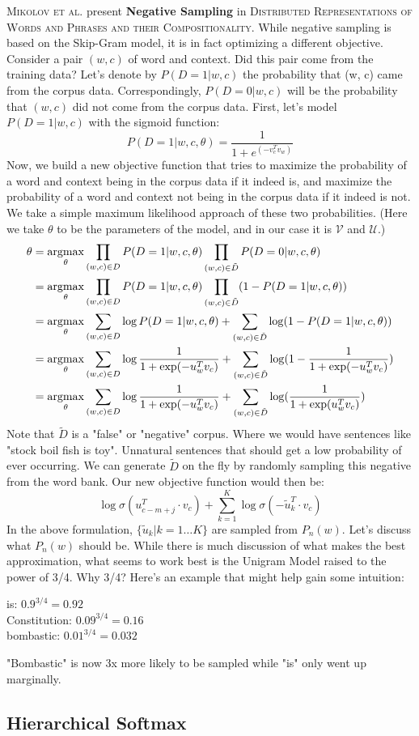 \documentclass{tufte-handout}
\newcommand{\argmax}{\operatornamewithlimits{argmax}}
\begin{document}
\textsc{Mikolov et al.} present \textbf{Negative Sampling} in \textsc{Distributed Representations of Words and Phrases and their Compositionality}. While negative sampling is based on the Skip-Gram model, it is in fact optimizing a different objective. Consider a pair $(w, c)$ of word and context. Did this pair come from the training data? Let's denote by $P(D = 1|w, c)$ the probability that (w, c) came from the corpus data. Correspondingly, $P(D = 0|w, c)$ will be the probability that $(w, c)$ did not come from the corpus data. First, let's model $P(D = 1|w, c)$ with the sigmoid function:
$$ P(D = 1|w, c, \theta) = \frac{1}{1+ e^{(-v_c^Tv_w)}}$$
Now, we build a new objective function that tries to maximize the probability of a word and context being in the corpus data if it indeed is, and maximize the probability of a word and context not being in the corpus data if it indeed is not. We take a simple maximum likelihood approach of these two probabilities. (Here we take $\theta$ to be the parameters of the model, and in our case it is $\mathcal{V}$ and $\mathcal{U}$.)
\begin{align*}
\theta &= \argmax_{\theta} \prod_{(w,c) \in D} P(D = 1|w, c, \theta) \prod_{(w,c) \in \tilde{D}} P(D = 0|w, c, \theta) \\
&= \argmax_{\theta} \prod_{(w,c) \in D} P(D = 1|w, c, \theta) \prod_{(w,c) \in \tilde{D}} (1 - P(D = 1|w, c, \theta))\\
&= \argmax_{\theta} \sum_{(w,c) \in D} \log P(D = 1|w, c, \theta) + \sum_{(w,c) \in \tilde{D}} \log(1 - P(D = 1|w, c, \theta))\\
&= \argmax_{\theta} \sum_{(w,c) \in D} \log \frac{1}{1 + \exp(-u_w^Tv_c)} + \sum_{(w,c) \in \tilde{D}} \log(1 - \frac{1}{1 + \exp(-u_w^Tv_c)} )\\
&= \argmax_{\theta} \sum_{(w,c) \in D} \log \frac{1}{1 + \exp(-u_w^Tv_c)} + \sum_{(w,c) \in \tilde{D}} \log(\frac{1}{1 + \exp(u_w^Tv_c)} )\\
\end{align*}
Note that $\tilde{D}$ is a "false" or "negative" corpus. Where we would have sentences like "stock boil fish is toy". Unnatural sentences that should get a low probability of ever occurring. We can generate $\tilde{D}$ on the fly by randomly sampling this negative from the word bank. Our new objective function would then be:
$$ \log \sigma (u_{c-m+j}^{T}\cdot v_{c})+ \sum_{k = 1}^K \log \sigma (- \tilde{u}_{k}^{T}\cdot v_{c}) $$
In the above formulation, $\{\tilde{u}_{k} | k = 1\hdots K\}$ are sampled from $P_n(w)$. Let's discuss what $P_n(w)$ should be. While there is much discussion of what makes the best approximation, what seems to work best is the Unigram Model raised to the power of 3/4. Why 3/4? Here's an example that might help gain some intuition:\\
\begin{center}
is: $0.9^{3/4} = 0.92$\\
Constitution: $0.09^{3/4} = 0.16$\\
bombastic: $0.01^{3/4} = 0.032$\\
\end{center}

"Bombastic" is now 3x more likely to be sampled while "is" only went up marginally.

\subsection{Hierarchical Softmax}


\end{document}

